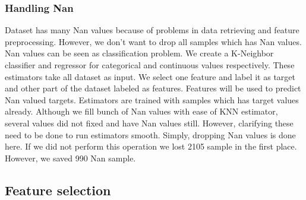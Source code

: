 \documentclass{article}
\begin{document}
\subsubsection{Handling Nan}
Dataset has many Nan values because of problems in data retrieving and feature preprocessing. However, we don’t want to drop all samples which has Nan values. Nan values can be seen as classification problem. We create a K-Neighbor classifier and regressor for categorical and continuous values respectively. These estimators take all dataset as input. We select one feature and label it as target and other part of the dataset labeled as features. Features will be used to predict Nan valued targets. Estimators are trained with samples which has target values already. Although we fill bunch of Nan values with ease of KNN estimator, several values did not fixed and have Nan values still. However, clarifying these need to be done to run estimators smooth. Simply, dropping Nan values is done here. If we did not perform this operation we lost 2105 sample in the first place. However, we saved 990 Nan sample.


\subsection{Feature selection}
\end{document}
